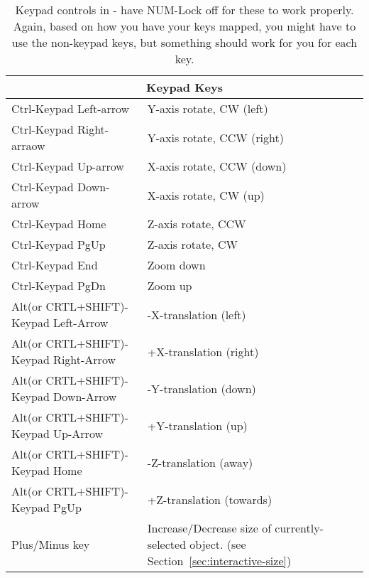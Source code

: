 \begin{table}[htbp]
\begin{center}
\begin{tabular}{|l|p{3in}|} \hline
        \multicolumn{2}{|c||}{\textbf{Keypad Keys}} \\ \hline
   Ctrl-Keypad Left-arrow  &  Y-axis rotate, CW (left)  \\ \hline
   Ctrl-Keypad Right-arraow  &  Y-axis rotate, CCW (right)\\ \hline
   Ctrl-Keypad Up-arrow  &  X-axis rotate, CCW (down) \\ \hline
   Ctrl-Keypad Down-arrow  &  X-axis rotate, CW (up) \\ \hline
   Ctrl-Keypad Home  &  Z-axis rotate, CCW  \\ \hline
   Ctrl-Keypad PgUp  &  Z-axis rotate, CW  \\ \hline
   Ctrl-Keypad End  &  Zoom down  \\ \hline
   Ctrl-Keypad PgDn  &  Zoom up  \\ \hline
    Alt(or CRTL+SHIFT)-Keypad Left-Arrow  &  -X-translation (left) \\ \hline 
    Alt(or CRTL+SHIFT)-Keypad Right-Arrow  &  +X-translation (right)\\ \hline
    Alt(or CRTL+SHIFT)-Keypad Down-Arrow  &  -Y-translation (down) \\ \hline
    Alt(or CRTL+SHIFT)-Keypad Up-Arrow  &  +Y-translation (up) \\ \hline
    Alt(or CRTL+SHIFT)-Keypad Home  &  -Z-translation (away) \\ \hline
    Alt(or CRTL+SHIFT)-Keypad PgUp  &  +Z-translation (towards)  \\ \hline
        Plus/Minus key  & Increase/Decrease size of
    currently-selected object. (see Section~\ref{sec:interactive-size})\\
\hline
\end{tabular}
\end{center}
\caption{Keypad controls in \map{} - have NUM-Lock off for these to work
    properly.   Again, based on how you have your keys mapped, you might
    have to use the non-keypad keys, but  something should work for you for
    each key.} 
\label{table:keypad}
\end{table}



